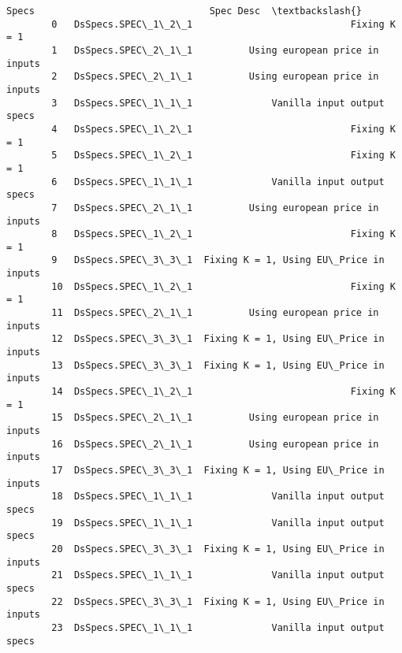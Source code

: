 \documentclass[11pt]{article}
\begin{document}
\begin{Verbatim}[commandchars=\\\{\}]
                         Specs                               Spec Desc  \textbackslash{}
        0   DsSpecs.SPEC\_1\_2\_1                            Fixing K = 1   
        1   DsSpecs.SPEC\_2\_1\_1          Using european price in inputs   
        2   DsSpecs.SPEC\_2\_1\_1          Using european price in inputs   
        3   DsSpecs.SPEC\_1\_1\_1              Vanilla input output specs   
        4   DsSpecs.SPEC\_1\_2\_1                            Fixing K = 1   
        5   DsSpecs.SPEC\_1\_2\_1                            Fixing K = 1   
        6   DsSpecs.SPEC\_1\_1\_1              Vanilla input output specs   
        7   DsSpecs.SPEC\_2\_1\_1          Using european price in inputs   
        8   DsSpecs.SPEC\_1\_2\_1                            Fixing K = 1   
        9   DsSpecs.SPEC\_3\_3\_1  Fixing K = 1, Using EU\_Price in inputs   
        10  DsSpecs.SPEC\_1\_2\_1                            Fixing K = 1   
        11  DsSpecs.SPEC\_2\_1\_1          Using european price in inputs   
        12  DsSpecs.SPEC\_3\_3\_1  Fixing K = 1, Using EU\_Price in inputs   
        13  DsSpecs.SPEC\_3\_3\_1  Fixing K = 1, Using EU\_Price in inputs   
        14  DsSpecs.SPEC\_1\_2\_1                            Fixing K = 1   
        15  DsSpecs.SPEC\_2\_1\_1          Using european price in inputs   
        16  DsSpecs.SPEC\_2\_1\_1          Using european price in inputs   
        17  DsSpecs.SPEC\_3\_3\_1  Fixing K = 1, Using EU\_Price in inputs   
        18  DsSpecs.SPEC\_1\_1\_1              Vanilla input output specs   
        19  DsSpecs.SPEC\_1\_1\_1              Vanilla input output specs   
        20  DsSpecs.SPEC\_3\_3\_1  Fixing K = 1, Using EU\_Price in inputs   
        21  DsSpecs.SPEC\_1\_1\_1              Vanilla input output specs   
        22  DsSpecs.SPEC\_3\_3\_1  Fixing K = 1, Using EU\_Price in inputs   
        23  DsSpecs.SPEC\_1\_1\_1              Vanilla input output specs   
        

\end{Verbatim}
\end{document}
